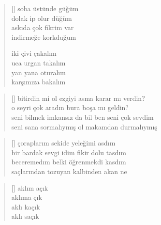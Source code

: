 \documentclass[10pt, openright, twoside]{memoir}
\theoremstyle{definition}
\begin{document}
\vspace*{\fill}
%
\newpage
{}
\vspace*{\fill}
\settowidth{\versewidth}{askıda çok fikrim var}
\begin{verse}[\versewidth]
  soba üstünde güğüm \\
  dolak ip olur düğüm \\
  askıda çok fikrim var \\
  indirmeğe korkduğum

  iki çivi çakalım \\
  uca urgan takalım \\
  yan yana oturalım \\
  karşımıza bakalım \\
\end{verse}
\vspace*{\fill}
%
\newpage
{}
\vspace*{\fill}
\settowidth{\versewidth}{seni bilmek imkansız da bil ben seni çok sevdim}
\begin{verse}[\versewidth]
  bitirdin mi ol ezgiyi asma karar mı verdin? \\
  o seyri çok aradın bura boşa mı geldin? \\
  seni bilmek imkansız da bil ben seni çok sevdim \\
  seni sana sormalıymış ol makamdan durmalıymış \\
\end{verse}
\vspace*{\fill}
%
\newpage
{}
\vspace*{\fill}
\settowidth{\versewidth}{bir bardak sevgi idim fikir dolu tasdım}
\begin{verse}[\versewidth]
  çoraplarım sekide yeleğimi asdım \\
  bir bardak sevgi idim fikir dolu tasdım \\
  beceremedım belki öğrenmekdi kasdım \\
  saçlarından tozuyan kalbinden akan ne \\
\end{verse}
\vspace*{\fill}
%
\newpage
{}
\vspace*{\fill}
\settowidth{\versewidth}{aklım açık}
\begin{verse}[\versewidth]
  aklım açık \\
  aklıma çık \\
  aklı kaçık \\
  aklı saçık \\
\end{verse}
\end{document}

